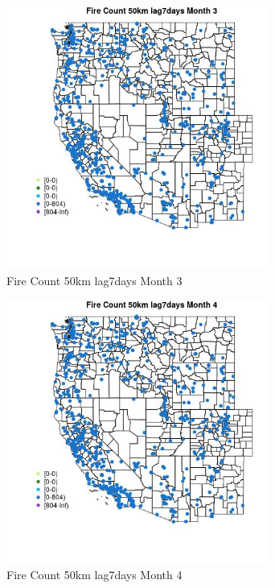 \begin{figure} 
\centering  
\includegraphics[width=0.77\textwidth]{Code_Outputs/Report_ML_input_PM25_Step4_part_f_de_duplicated_aves_prioritize_24hr_obswNAs_MapObsMo3Fire_Count_50km_lag7days.jpg} 
\caption{\label{fig:Report_ML_input_PM25_Step4_part_f_de_duplicated_aves_prioritize_24hr_obswNAsMapObsMo3Fire_Count_50km_lag7days}Fire Count 50km lag7days Month 3} 
\end{figure} 
 

\begin{figure} 
\centering  
\includegraphics[width=0.77\textwidth]{Code_Outputs/Report_ML_input_PM25_Step4_part_f_de_duplicated_aves_prioritize_24hr_obswNAs_MapObsMo4Fire_Count_50km_lag7days.jpg} 
\caption{\label{fig:Report_ML_input_PM25_Step4_part_f_de_duplicated_aves_prioritize_24hr_obswNAsMapObsMo4Fire_Count_50km_lag7days}Fire Count 50km lag7days Month 4} 
\end{figure} 
 

